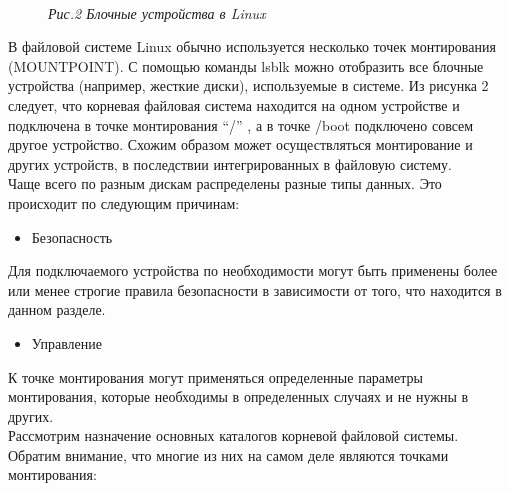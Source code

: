 \documentclass[14pt, a4paper]{article}
\begin{document}
\begin{figure}[h]
    \centering
    \\ 
    \small\textit{Рис.2 Блочные устройства в Linux}  
    \label{framework} 
\end{figure}

В файловой системе Linux обычно используется несколько точек монтирования (MOUNTPOINT). С
помощью команды \colorbox{backcolour}{lsblk} можно отобразить все блочные устройства (например, жесткие диски),
используемые в системе. Из рисунка 2 следует, что корневая файловая система находится на одном
устройстве и подключена в точке монтирования \colorbox{backcolour}{“/”} , а в точке \colorbox{backcolour}{/boot} подключено совсем другое
устройство. Схожим образом может осуществляться монтирование и других устройств, в последствии
интегрированных в файловую систему.\\

Чаще всего по разным дискам распределены разные типы данных. Это происходит по следующим
причинам:
\begin{itemize}
    \item Безопасность
\end{itemize}

\noindent Для подключаемого устройства по необходимости могут быть применены более или менее строгие
правила безопасности в зависимости от того, что находится в данном разделе.

\begin{itemize}
    \item Управление
\end{itemize}

\noindent К точке монтирования могут применяться определенные параметры монтирования, которые
необходимы в определенных случаях и не нужны в других.\\

Рассмотрим назначение основных каталогов корневой файловой системы. Обратим внимание, что
многие из них на самом деле являются точками монтирования:
\end{document}
